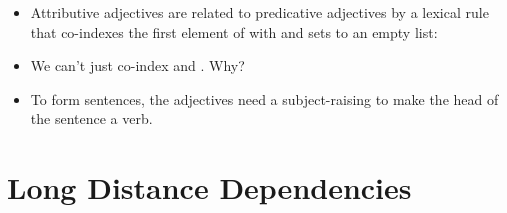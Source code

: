 \documentclass[a4paper,landscape,headrule,footrule]{foils}
\begin{document}
\begin{itemize}
 \item Attributive adjectives are related to predicative adjectives by
   a lexical rule that co-indexes the first element of  with
    and sets  to an empty list: 
     \into {}
   \\    
 \item We can't just co-index  and .  Why?
 \item To form sentences, the  adjectives need a
   subject-raising \eng{be} to make the head of the sentence a verb.
 \end{itemize}


\section{Long Distance Dependencies}
\end{document}
